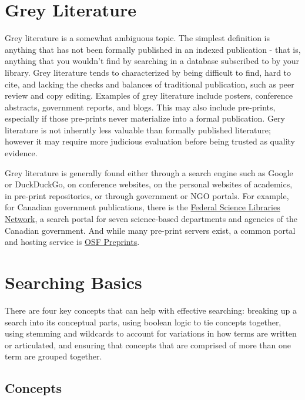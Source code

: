 \documentclass[
]{book}
\begin{document}
\hypertarget{grey-literature}{%
\section{Grey Literature}\label{grey-literature}}

Grey literature is a somewhat ambiguous topic. The simplest definition is anything that has not been formally published in an indexed publication - that is, anything that you wouldn't find by searching in a database subscribed to by your library. Grey literature tends to characterized by being difficult to find, hard to cite, and lacking the checks and balances of traditional publication, such as peer review and copy editing. Examples of grey literature include posters, conference abstracts, government reports, and blogs. This may also include pre-prints, especially if those pre-prints never materialize into a formal publication. Gery literature is not inherntly less valuable than formally published literature; however it may require more judicious evaluation before being trusted as quality evidence.

Grey literature is generally found either through a search engine such as Google or DuckDuckGo, on conference websites, on the personal websites of academics, in pre-print repositories, or through government or NGO portals. For example, for Canadian government publications, there is the \href{https://science-libraries.canada.ca/eng/home/}{Federal Science Libraries Network}, a search portal for seven science-based departments and agencies of the Canadian government. And while many pre-print servers exist, a common portal and hosting service is \href{https://osf.io/preprints/}{OSF Preprints}.

\hypertarget{searching-basics}{%
\section{Searching Basics}\label{searching-basics}}

There are four key concepts that can help with effective searching: breaking up a search into its conceptual parts, using boolean logic to tie concepts together, using stemming and wildcards to account for variations in how terms are written or articulated, and ensuring that concepts that are comprised of more than one term are grouped together.

\hypertarget{concepts}{%
\subsection{Concepts}\label{concepts}}
\end{document}
